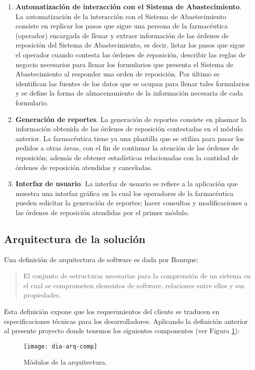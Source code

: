 \begin{enumerate}
\item \textbf{Automatización de interacción con el Sistema de Abastecimiento}. La automatización de la interacción con el Sistema de Abastecimiento consiste en replicar los pasos que sigue una persona de la farmacéutica (operador) encargada de llenar y extraer información de las órdenes de reposición del Sistema de Abastecimiento, es decir, listar los pasos que sigue el operador cuando contesta las órdenes de reposición, describir las reglas de negocio necesarios para llenar los formularios que presenta el Sistema de Abastecimiento al responder una orden de reposición. Por último se identifican las fuentes de los datos que se ocupan para llenar tales formularios y se define la forma de almacenamiento de la información necesaria de cada formulario.
\item \textbf{Generación de reportes}. La generación de reportes consiste en plasmar la información obtenida de las órdenes de reposición contestadas en el módulo anterior. La farmacéutica tiene ya una plantilla que se utiliza para pasar los pedidos a otras áreas, con el fin de continuar la atención de las órdenes de reposición; además de obtener estadísticas relacionadas con la cantidad de órdenes de reposición atendidas y canceladas.
\item \textbf{Interfaz de usuario}. La interfaz de usuario se refiere a la aplicación que muestra una interfaz gráfica en la cual los operadores de la farmacéutica pueden solicitar la generación de reportes; hacer consultas y modificaciones a las órdenes de reposición atendidas por el primer módulo.
\end{enumerate}

\subsection{Arquitectura de la solución}
Una definición de arquitectura de software es dada por Bourque:
\begin{quote}
El conjunto de estructuras necesarias para la comprensión de un sistema en el cual se comprometen elementos de software, relaciones entre ellos y sus propiedades\cite{SWEBOOK}.
\end{quote}
Esta definición expone que los requerimientos del cliente se traducen en especificaciones técnicas para los desarrolladores. Aplicando la definición anterior al presente proyecto donde tenemos los siguientes componentes (ver Figura \ref{fig:dia-arq-comp}):
\begin{figure}[h]
\centering
\texttt{[image: dia-arq-comp]} 
\caption{Módulos de la arquitectura.}
\label{fig:dia-arq-comp}
\end{figure}

